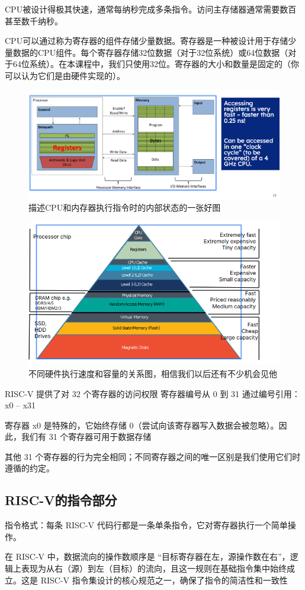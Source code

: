\documentclass{ctexart}
\begin{document}
CPU被设计得极其快速，通常每纳秒完成多条指令。访问主存储器通常需要数百甚至数千纳秒。  \par

CPU可以通过称为寄存器的组件存储少量数据。寄存器是一种被设计用于存储少量数据的CPU组件。每个寄存器存储32位数据（对于32位系统）或64位数据（对于64位系统）。在本课程中，我们只使用32位。寄存器的大小和数量是固定的（你可以认为它们是由硬件实现的）。 \par
\begin{figure}
    \centering
    \includegraphics[width=0.5\linewidth]{描述CPU和内存在执行指令是的内部状态.png}
    \caption{描述CPU和内存器执行指令时的内部状态的一张好图}
    \label{fig:enter-label}
\end{figure}
\begin{figure}
    \centering
    \includegraphics[width=0.5\linewidth]{不同硬件执行速度和容量的关系图.png}
    \caption{不同硬件执行速度和容量的关系图，相信我们以后还有不少机会见他}
    \label{fig:enter-label}
\end{figure}
RISC-V 提供了对 32 个寄存器的访问权限
寄存器编号从 0 到 31
通过编号引用：x0 – x31\par
寄存器 x0 是特殊的，它始终存储 0（尝试向该寄存器写入数据会被忽略）。因此，我们有 31 个寄存器可用于数据存储\par
其他 31 个寄存器的行为完全相同；不同寄存器之间的唯一区别是我们使用它们时遵循的约定。
\subsection{RISC-V的指令部分}
指令格式：每条 RISC-V 代码行都是一条单条指令，它对寄存器执行一个简单操作。\par
在 RISC-V 中，数据流向的操作数顺序是 “目标寄存器在左，源操作数在右”，逻辑上表现为从右（源）到左（目标）的流向，且这一规则在基础指令集中始终成立。这是 RISC-V 指令集设计的核心规范之一，确保了指令的简洁性和一致性
\end{document}
